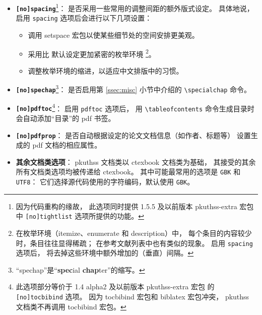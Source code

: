 \begin{itemize}
	\item \textbf{\texttt{[no]spacing}}\footnote{%
			因为代码重构的缘故，
			此选项同时提供 1.5.5 及以前版本 pkuthss-extra 宏包
			中 \texttt{[no]tightlist} 选项所提供的功能。%
		}：
		是否采用一些常用的调整间距的额外版式设定。
		具体地说，启用 \verb|spacing| 选项后会进行以下几项设置：
	\begin{itemize}
		\item 调用 setspace 宏包以使某些细节处的空间安排更美观。
		\item 采用比  默认设定更加紧密的枚举环境%
			\footnote{%
				在枚举环境（itemize、enumerate 和 description）中，
				每个条目的内容较少时，条目往往显得稀疏；
				在参考文献列表中也有类似的现象。
				启用 \texttt{spacing} 选项后，
				将去掉这些环境中额外增加的（垂直）间隔。%
			}。
		\item 调整枚举环境的缩进，以适应中文排版中的习惯。
	\end{itemize}

	\item \textbf{\texttt{[no]spechap}}\footnote{%
			“spechap”是“\textbf{spec}ial \textbf{chap}ter”的缩写。%
		}：
		是否启用第 \ref{ssec:misc} 小节中介绍的 \verb|\specialchap| 命令。

	\item \textbf{\texttt{[no]pdftoc}}\footnote{%
			此选项部分等价于 1.4 alpha2 及以前版本 pkuthss-extra 宏包
			的 \texttt{[no]tocbibind} 选项。
			因为 tocbibind 宏包和 biblatex 宏包冲突，%
			pkuthss 文档类不再调用 tocbibind 宏包。%
		}：
		启用 \verb|pdftoc| 选项后，
		用 \verb|\tableofcontents| 命令生成目录时会自动添加“目录”的 pdf 书签。

	\item \textbf{\texttt{[no]pdfprop}}：
		是否自动根据设定的论文文档信息（如作者、标题等）
		设置生成的 pdf 文档的相应属性。

	\item \textbf{其余文档类选项}：%
		pkuthss 文档类以 ctexbook 文档类为基础，
		其接受的其余所有文档类选项均被传递给 ctexbook。
		其中可能最常用的选项是 \verb|GBK| 和 \verb|UTF8|：
		它们选择源代码使用的字符编码，默认使用 \verb|GBK|。
\end{itemize}

